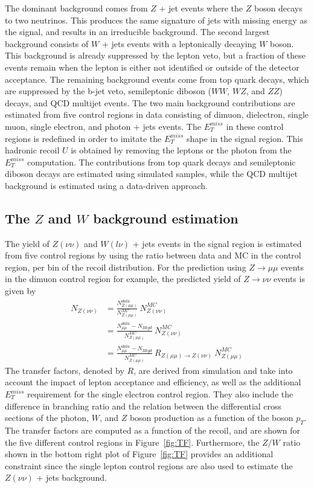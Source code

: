 The dominant background comes from $Z$ + jet events where the $Z$ boson decays to two neutrinos. This produces the same signature of jets with missing energy as the signal, and results in an irreducible background. The second largest background consists of $W$ + jets events with a leptonically decaying $W$ boson. This background is already suppressed by the lepton veto, but a fraction of these events remain when the lepton is either not identified or outside of the detector acceptance. The remaining background events come from top quark decays, which are suppressed by the b-jet veto, semileptonic diboson ($WW$, $WZ$, and $ZZ$) decays, and QCD multijet events. The two main background contributions are estimated from five control regions in data consisting of dimuon, dielectron, single muon, single electron, and photon + jets events. The $E_T^{miss}$ in these control regions is redefined in order to imitate the $E_T^{miss}$ shape in the signal region. This hadronic recoil $U$ is obtained by removing the leptons or the photon from the $E_T^{miss}$ computation. The contributions from top quark decays and semileptonic diboson decays are estimated using simulated samples, while the QCD multijet background is estimated using a data-driven approach.

\subsection{The \boldmath$Z$ and \boldmath$W$ background estimation}

The yield of $Z(\nu\nu)$ and $W(l\nu)$ + jets events in the signal region is estimated from five control regions by using the ratio between data and MC in the control region, per bin of the recoil distribution. For the prediction using $Z\rightarrow \mu\mu$ events in the dimuon control region for example, the predicted yield of $Z\rightarrow\nu\nu$ events is given by
\begin{align}
 N_{Z(\nu\nu)} &= \frac{N_{Z(\mu\mu)}^{data}}{N_{Z(\mu\mu)}^{MC}}\ N_{Z(\nu\nu)}^{MC}\\
 &= \frac{N_{\mu\mu}^{data} - N_{Bkgd}}{N_{Z(\mu\mu)}^{MC}}\ N_{Z(\nu\nu)}^{MC} \\
 &= \frac{N_{\mu\mu}^{data} - N_{Bkgd}}{N_{Z(\mu\mu)}^{MC}}\ R_{Z(\mu\mu)\rightarrow Z(\nu\nu)}\ N_{Z(\mu\mu)}^{MC}
\end{align}
The transfer factors, denoted by $R$, are derived from simulation and take into account the impact of lepton acceptance and efficiency, as well as the additional $E_T^{miss}$ requirement for the single electron control region. They also include the difference in branching ratio and the relation between the differential cross sections of the photon, $W$, and $Z$ boson production as a function of the boson $p_T$. The transfer factors are computed as a function of the recoil, and are shown for the five different control regions in Figure~\ref{fig:TF}. Furthermore, the $Z/W$ ratio shown in the bottom right plot of Figure~\ref{fig:TF} provides an additional constraint since the single lepton control regions are also used to  estimate the $Z(\nu\nu)$ + jets background.


